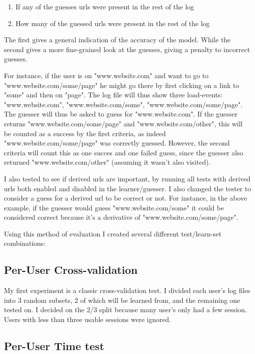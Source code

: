 \documentclass{article}
\begin{document}
\begin{enumerate}
    \item If any of the guesses urls were present in the rest of the log
    \item How many of the guessed urls were present in the rest of the log
\end{enumerate}

The first gives a general indication of the accuracy of the model.
While the second gives a more fine-grained look at the guesses, giving a penalty to incorrect guesses.

For instance, if the user is on "www.website.com" and want to go to "www.website.com/some/page" he might go there by first clicking on a link to "some" and then on "page".
The log file will thus show three load-events: "www.website.com", "www.website.com/some", "www.website.com/some/page".
The guesser will thus be asked to guess for "www.website.com".
If the guesser returns "www.website.com/some/page" and "www.website.com/other", this will be counted as a success by the first criteria, as indeed "www.website.com/some/page" was correctly guessed.
However, the second criteria will count this as one succes and one failed guess, since the guesser also returned "www.website.com/other" (assuming it wasn't also visited).

I also tested to see if derived urls are important, by running all tests with derived urls both enabled and disabled in the learner/guesser.
I also changed the tester to consider a guess for a derived url to be correct or not.
For instance, in the above example, if the guesser would guess "www.website.com/some" it could be considered correct because it's a derivative of "www.website.com/some/page".

Using this method of evaluation I created several different test/learn-set combinations:

\subsection{Per-User Cross-validation}

My first experiment is a classic cross-validation test.
I divided each user's log files into 3 random subsets, 2 of which will be learned from, and the remaining one tested on.
I decided on the 2/3 split because many user's only had a few session.
Users with less than three usable sessions were ignored.

\subsection{Per-User Time test}
\end{document}
